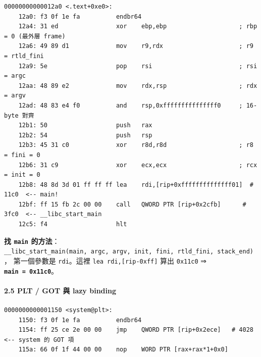 \documentclass[10pt,a4paper]{article}
\begin{document}
\begin{Verbatim}[breaklines=true,breakanywhere=true,breakautoindent=false,fontsize=\fontsize{7.0}{9.5}\selectfont]
00000000000012a0 <.text+0xe0>:
    12a0: f3 0f 1e fa          endbr64
    12a4: 31 ed                xor    ebp,ebp                    ; rbp = 0 (最外層 frame)
    12a6: 49 89 d1             mov    r9,rdx                     ; r9 = rtld_fini
    12a9: 5e                   pop    rsi                        ; rsi = argc
    12aa: 48 89 e2             mov    rdx,rsp                    ; rdx = argv
    12ad: 48 83 e4 f0          and    rsp,0xfffffffffffffff0     ; 16-byte 對齊
    12b1: 50                   push   rax
    12b2: 54                   push   rsp
    12b3: 45 31 c0             xor    r8d,r8d                    ; r8 = fini = 0
    12b6: 31 c9                xor    ecx,ecx                    ; rcx = init = 0
    12b8: 48 8d 3d 01 ff ff ff lea    rdi,[rip+0xffffffffffffff01]  # 11c0  <-- main!
    12bf: ff 15 fb 2c 00 00    call   QWORD PTR [rip+0x2cfb]      # 3fc0  <-- __libc_start_main
    12c5: f4                   hlt
\end{Verbatim}

\textbf{找 \texttt{main}
的方法}：\texttt{\_\allowbreak{}\_\allowbreak{}libc\_\allowbreak{}start\_\allowbreak{}main(main,\allowbreak{}\ \allowbreak{}argc,\allowbreak{}\ \allowbreak{}argv,\allowbreak{}\ \allowbreak{}init,\allowbreak{}\ \allowbreak{}fini,\allowbreak{}\ \allowbreak{}rtld\_\allowbreak{}fini,\allowbreak{}\ \allowbreak{}stack\_\allowbreak{}end)}，
第一個參數是 \texttt{rdi}。這裡 \texttt{lea\ \allowbreak{}rdi,{[}rip-\allowbreak{}0xff{]}} 算出
\texttt{0x11c0} ⇒ \textbf{\texttt{main\ \allowbreak{}=\ \allowbreak{}0x11c0}}。

\paragraph{2.5 PLT / GOT 與 lazy
binding}\label{plt-got-ux8207-lazy-binding}

\begin{Verbatim}[breaklines=true,breakanywhere=true,breakautoindent=false,fontsize=\fontsize{7.0}{9.5}\selectfont]
0000000000001150 <system@plt>:
    1150: f3 0f 1e fa          endbr64
    1154: ff 25 ce 2e 00 00    jmp    QWORD PTR [rip+0x2ece]   # 4028   <-- system 的 GOT 項
    115a: 66 0f 1f 44 00 00    nop    WORD PTR [rax+rax*1+0x0]
\end{Verbatim}
\end{document}
